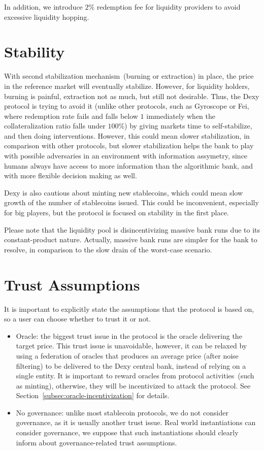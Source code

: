 \documentclass[a4paper,UKenglish,cleveref, autoref, thm-restate]{lipics-v2021}
\newcommand{\sct}{stablecoin}
\newcommand{\dx}{Dexy}
\begin{document}
In addition, we introduce $2\%$ redemption fee for liquidity providers to avoid excessive liquidity hopping.

\section{Stability}
\label{sec:stability}

With second stabilization mechanism~(burning or extraction) in place, the price in the reference market will eventually stabilize. However, for liquidity holders, burning is painful, extraction not as much, but still not desirable. Thus, the \dx{} protocol is trying to avoid it (unlike other protocols, such as Gyroscope or Fei, where redemption rate fails and falls below $1$ immediately when the collateralization ratio falls under $100\%$) by giving markets time to self-stabilize, and then doing interventions. However, this could mean slower stabilization, in comparison with other protocols, but slower stabilization helps the bank to play with possible adversaries in an environment with information assymetry, since humans always have access to more information than the algorithmic bank, and with more flexible decision making as well.

\dx{} is also cautious about minting new \sct{}s, which could mean slow growth of the number of stablecoins issued. This could be inconvenient, especially for big players, but the protocol is focused on stability in the first place. 

Please note that the liquidity pool is disincentivizing massive bank runs due to its constant-product nature. Actually, massive bank runs are simpler for the bank to resolve, in comparison to the slow drain of the worst-case scenario.

\section{Trust Assumptions}
\label{sec:kya}

It is important to explicitly state the assumptions that the protocol is based on, so a user can choose whether to trust it or not.

\begin{itemize}
  \item{Oracle:} the biggest trust issue in the protocol is the oracle delivering the target price. This trust issue is unavoidable, however, it can be relaxed by using a federation of oracles that produces an average price (after noise filtering) to be delivered to the Dexy central bank, instead of relying on a single entity.
  It is important to reward oracles from protocol activities~(such as minting), otherwise, they will be incentivized to attack the protocol. See Section~\ref{subsec:oracle-incentivization} for details.

  \item{No governance:} unlike most stablecoin protocols, we do not consider governance, as it is usually another trust issue. Real world instantiations can consider governance, we suppose that such instantiations should clearly inform about governance-related trust assumptions.
\end{itemize}
\end{document}
